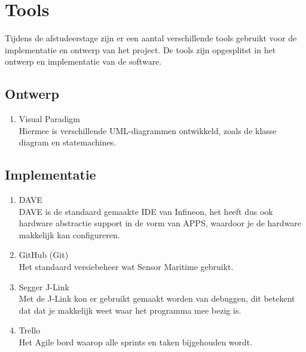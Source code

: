 \section{Tools}
Tijdens de afstudeerstage zijn er een aantal verschillende tools gebruikt voor de implementatie en ontwerp van het project. De tools zijn opgesplitst in het ontwerp en implementatie van de software.

\subsection{Ontwerp}
\begin{enumerate}
	\item Visual Paradigm \\ Hiermee is verschillende UML-diagrammen ontwikkeld, zoals de klasse diagram en statemachines.
\end{enumerate}
\subsection{Implementatie}
\begin{enumerate}
	\item DAVE \\ DAVE is de standaard gemaakte IDE van Infineon, het heeft dus ook hardware abstractie support in de vorm van APPS, waardoor je de hardware makkelijk kan configureren.
	\item GitHub (Git) \\ Het standaard versiebeheer wat Sensor Maritime gebruikt.
	\item Segger J-Link \\ Met de J-Link kon er gebruikt gemaakt worden van debuggen, dit betekent dat dat je makkelijk weet waar het programma mee bezig is.
	\item Trello \\ Het Agile bord waarop alle sprints en taken bijgehouden wordt.
\end{enumerate}

